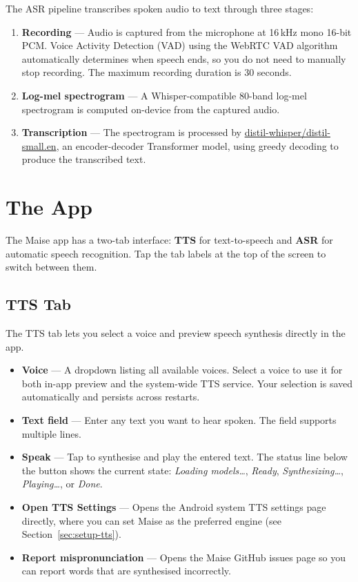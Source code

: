 \documentclass[12pt,a4paper]{article}
\begin{document}
The ASR pipeline transcribes spoken audio to text through three stages:

\begin{enumerate}
    \item \textbf{Recording} — Audio is captured from the microphone at 16\,kHz mono 16-bit PCM. Voice Activity Detection (VAD) using the WebRTC VAD algorithm automatically determines when speech ends, so you do not need to manually stop recording. The maximum recording duration is 30 seconds.
    \item \textbf{Log-mel spectrogram} — A Whisper-compatible 80-band log-mel spectrogram is computed on-device from the captured audio.
    \item \textbf{Transcription} — The spectrogram is processed by \href{https://github.com/huggingface/distil-whisper}{distil-whisper/distil-small.en}, an encoder-decoder Transformer model, using greedy decoding to produce the transcribed text.
\end{enumerate}

\section{The App}

The Maise app has a two-tab interface: \textbf{TTS} for text-to-speech and \textbf{ASR} for automatic speech recognition. Tap the tab labels at the top of the screen to switch between them.

\subsection{TTS Tab}

The TTS tab lets you select a voice and preview speech synthesis directly in the app.

\begin{itemize}[noitemsep]
    \item \textbf{Voice} — A dropdown listing all available voices. Select a voice to use it for both in-app preview and the system-wide TTS service. Your selection is saved automatically and persists across restarts.
    \item \textbf{Text field} — Enter any text you want to hear spoken. The field supports multiple lines.
    \item \textbf{Speak} — Tap to synthesise and play the entered text. The status line below the button shows the current state: \emph{Loading models\ldots}, \emph{Ready}, \emph{Synthesizing\ldots}, \emph{Playing\ldots}, or \emph{Done}.
    \item \textbf{Open TTS Settings} — Opens the Android system TTS settings page directly, where you can set Maise as the preferred engine (see Section~\ref{sec:setup-tts}).
    \item \textbf{Report mispronunciation} — Opens the Maise GitHub issues page so you can report words that are synthesised incorrectly.
\end{itemize}
\end{document}
